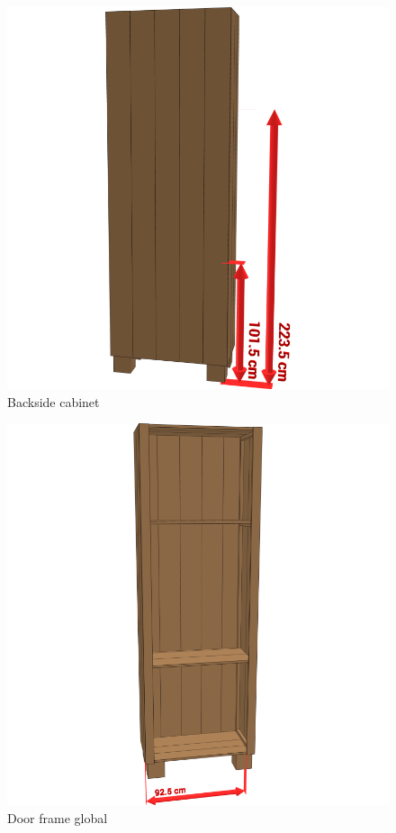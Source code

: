 \documentclass{article}
\begin{document}
\begin{figure}[h!]
    \centering
    \includegraphics[width=\textwidth]{scene 9 - achterkant.png}
    \caption{Backside cabinet}
\end{figure}

\begin{figure}[h!]
    \centering
    \includegraphics[width=\textwidth]{scene 10 - deurpost a.png}
    \caption{Door frame global}
\end{figure}
\end{document}
